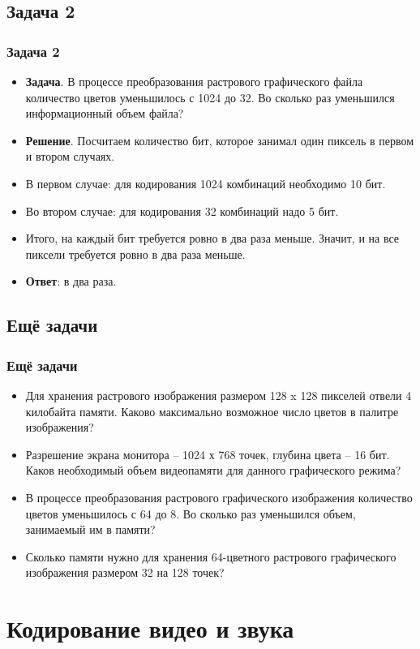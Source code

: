 \documentclass[compress,red]{beamer}
\begin{document}
\subsection{Задача 2}
\begin{frame}[fragile]
  \frametitle{Задача 2}
  \begin{itemize}[<+->]
    \item \textbf{Задача}. В процессе преобразования растрового графического файла количество цветов уменьшилось с 1024 до 32. Во сколько раз уменьшился информационный объем файла?
    \item \textbf{Решение}. Посчитаем количество бит, которое занимал один пиксель в первом и втором случаях.
    \item В первом случае: для кодирования 1024 комбинаций необходимо 10 бит.
    \item Во втором случае: для кодирования 32 комбинаций надо 5 бит.
    \item Итого, на каждый бит требуется ровно в два раза меньше. Значит, и на все пиксели требуется ровно в два раза меньше.
    \item \textbf{Ответ}: в два раза.
  \end{itemize}
\end{frame}

\subsection{Ещё задачи}
\begin{frame}[fragile]
  \frametitle{Ещё задачи}
  \begin{itemize}[<+->]
    \item Для хранения растрового изображения размером 128 x 128 пикселей отвели 4 килобайта памяти. Каково максимально возможное число цветов в палитре изображения?
    \item Разрешение экрана монитора – 1024 х 768 точек, глубина цвета – 16 бит. Каков необходимый объем видеопамяти для данного графического режима?
    \item В процессе преобразования растрового графического изображения количество цветов уменьшилось с 64 до 8. Во сколько раз уменьшился объем, занимаемый им в памяти?
    \item Сколько памяти нужно для хранения 64-цветного растрового графического изображения размером  32 на 128 точек?
  \end{itemize}
\end{frame}

\section{Кодирование видео и звука}
\end{document}
